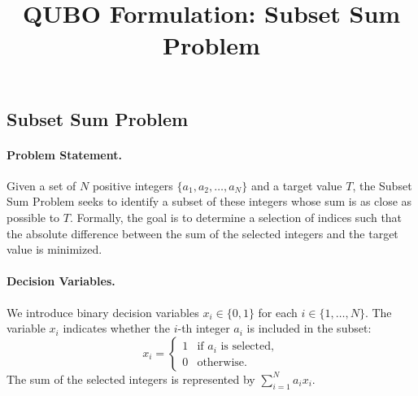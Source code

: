 \documentclass[12pt]{article}
\title{QUBO Formulation: Subset Sum Problem}
\date{}
\begin{document}
\maketitle

\subsection*{Subset Sum Problem}

\paragraph{Problem Statement.}
Given a set of $N$ positive integers $\{a_1, a_2, \dots, a_N\}$ and a target value $T$, the Subset Sum Problem seeks to identify a subset of these integers whose sum is as close as possible to $T$. Formally, the goal is to determine a selection of indices such that the absolute difference between the sum of the selected integers and the target value is minimized.

\paragraph{Decision Variables.}
We introduce binary decision variables $x_i \in \{0, 1\}$ for each $i \in \{1, \dots, N\}$. The variable $x_i$ indicates whether the $i$-th integer $a_i$ is included in the subset:
\begin{equation}
    x_i = \begin{cases}
    1 & \text{if } a_i \text{ is selected}, \\
    0 & \text{otherwise}.
    \end{cases}
\end{equation}
The sum of the selected integers is represented by $\sum_{i=1}^N a_i x_i$.
\end{document}
